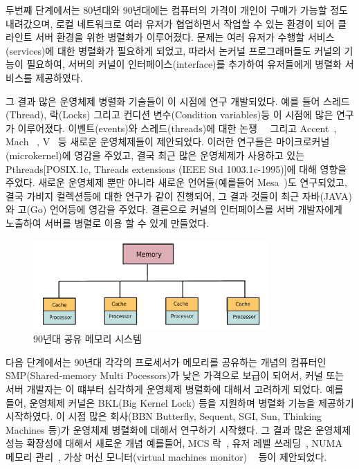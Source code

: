 두번째 단계에서는 80년대와 90년대에는 컴퓨터의 가격이 개인이 구매가 가능할 정도 내려갔으며,
 로컬 네트워크로 여러 유저가 
협업하면서 작업할 수 있는 환경이 되어 클라인트 서버 환경을 위한 병렬화가 이루어졌다.
문제는 여러 유저가 수행할 서비스(services)에 대한 병렬화가 필요하게 되었고, 
따라서 논커널 프로그래머들도 커널의 기능이 필요하여, 서버의 커널이 인터페이스(interface)를
 추가하여 유저들에게 병렬화 서비스를 제공하였다. 
 
그 결과 많은 운영체제 병렬화 기술들이 이 시점에 연구 개발되었다. 
예를 들어 스레드(Thread), 락(Locks) 그리고 컨디션 변수(Condition variables)등 이 시점에 많은 연구가 
이루어졌다.
이벤트(events)와 스레드(threads)에 대한 논쟁~\cite{Ous96}~\cite{vonBehren2003WEB}
그리고 Accent~\cite{Rashid1981ACO},
Mach~\cite{Accetta86mach} , V~\cite{Cheriton1983DVK} 등 새로운 운영체제들이 제안되었다. 
이러한 연구들은 마이크로커널(microkernel)에 영감을 주었고, 결국 최근 많은 운영체제가 사용하고 있는 
Pthreads[POSIX.1c, Threads extensions (IEEE Std 1003.1c-1995)]에 대해 영향을 주었다. 
새로운 운영체제 뿐만 아니라 새로운 언어들(예를들어 Mesa~\cite{Lampson1979EPM})도
 연구되었고, 결국 가비지 컬렉션등에 대한 연구가 같이 진행되어, 그 결과 것들이 최근 자바(JAVA)와 고(Go) 언어등에
 영감을 주었다.
결론으로 커널의 인터페이스를 서버 개발자에게 노출하여 서버를 병렬로 이용 할 수 있게 만들었다.


\begin{figure}[h]
    \centering
    \includegraphics[width=0.8\textwidth]{fig/shared_memory}
    \caption{90년대 공유 메모리 시스템}
  \label{shared_memory}
\end{figure}




다음 단계에서는 90년대 각각의 프로세서가 메모리를 공유하는 개념의 컴퓨터인 SMP(Shared-memory Multi
Pocessors)가 낮은 가격으로 보급이 되어서, 커널 또는 서버 개발자는 이 떄부터 심각하게 운영체제 병렬화에 대해서 고려하게 되었다.
예를 들어, 운영체제 커널은 BKL(Big Kernel Lock) 등을 지원하며 병렬화 기능을 제공하기 시작하였다.
이 시점 많은 회사(BBN Butterfly, Sequent, SGI, Sun, Thinking Machines 등)가 운영체제 병렬화에 대해서 
연구하기 시작했다.
그 결과 많은 운영체제 성능 확장성에 대해서 새로운 개념 예를들어, 
MCS 락~\cite{MellorCrummey1991MCS}, 유저 레벨 쓰레딩~\cite{Marsh1991FUT},
 NUMA 메모리 관리~\cite{Bolosky1991NPR}, 가상 머신 모니터(virtual machines monitor)
~\cite{Bugnion1997DRC} 등이 제안되었다.  


